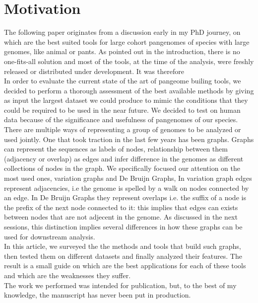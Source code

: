 \section{Motivation}
The following paper originates from a discussion early in my PhD journey, on which are the best suited tools for large cohort pangenomes of species with large genomes, like animal or pants. As pointed out in the introduction, there is no one-fits-all solution and  most of the tools, at the time of the analysis, were freshly released or distributed under development. It was therefore \\
In order to evaluate the current state of the art of pangeome builing tools, we decided to perform a thorough assessment of the best available methods by giving as input the largest dataset we could produce to mimic the conditions that they could be required to be used in the near future. We decided to test on human data because of the significance and usefulness of pangenomes of our species. \\
There are multiple ways of representing a group of genomes to be analyzed or used jointly. One that took traction in the last few years has been graphs. Graphs can represent the sequences as labels of nodes, relationship between them (adjacency or overlap) as edges and infer difference in the genomes as different collections of nodes in the graph.
We specifically focused our attention on the most used ones, variation graphs and De Bruijn Graphs, In variation graph edges represent adjacencies, i.e the genome is spelled by a walk on nodes connected by an edge. In De Bruijn Graphs they represent overlaps i.e. the suffix of a node is the prefix of the next node connected to it: this implies that edges can exists between nodes that are not adjecent in the genome. As discussed in the next sessions, this distinction implies several differences in how these graphs can be used for downstream analysis. \\ In this article, we surveyed the the methods and tools that build such graphs, then tested them on different datasets and finally analyzed their features. The result is a small guide on which are the best applications for each of these tools and which are the weaknesses they suffer. \\
The work we performed was intended for publication, but, to the best of my knowledge, the manuscript has never been put in production.

